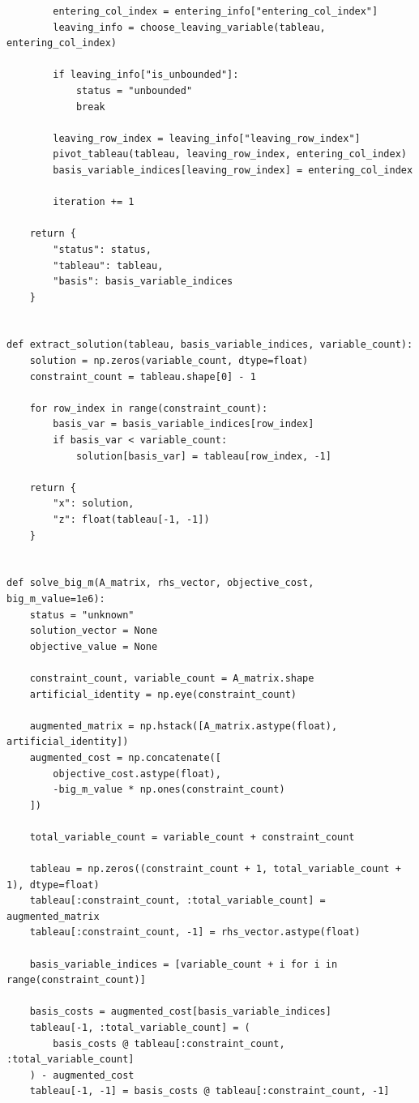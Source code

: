 \documentclass[a4paper,14pt]{extarticle}
\begin{document}
\begin{lstlisting}
        entering_col_index = entering_info["entering_col_index"]
        leaving_info = choose_leaving_variable(tableau, entering_col_index)

        if leaving_info["is_unbounded"]:
            status = "unbounded"
            break

        leaving_row_index = leaving_info["leaving_row_index"]
        pivot_tableau(tableau, leaving_row_index, entering_col_index)
        basis_variable_indices[leaving_row_index] = entering_col_index

        iteration += 1

    return {
        "status": status,
        "tableau": tableau,
        "basis": basis_variable_indices
    }


def extract_solution(tableau, basis_variable_indices, variable_count):
    solution = np.zeros(variable_count, dtype=float)
    constraint_count = tableau.shape[0] - 1

    for row_index in range(constraint_count):
        basis_var = basis_variable_indices[row_index]
        if basis_var < variable_count:
            solution[basis_var] = tableau[row_index, -1]

    return {
        "x": solution,
        "z": float(tableau[-1, -1])
    }


def solve_big_m(A_matrix, rhs_vector, objective_cost, big_m_value=1e6):
    status = "unknown"
    solution_vector = None
    objective_value = None

    constraint_count, variable_count = A_matrix.shape
    artificial_identity = np.eye(constraint_count)

    augmented_matrix = np.hstack([A_matrix.astype(float), artificial_identity])
    augmented_cost = np.concatenate([
        objective_cost.astype(float),
        -big_m_value * np.ones(constraint_count)
    ])

    total_variable_count = variable_count + constraint_count

    tableau = np.zeros((constraint_count + 1, total_variable_count + 1), dtype=float)
    tableau[:constraint_count, :total_variable_count] = augmented_matrix
    tableau[:constraint_count, -1] = rhs_vector.astype(float)

    basis_variable_indices = [variable_count + i for i in range(constraint_count)]

    basis_costs = augmented_cost[basis_variable_indices]
    tableau[-1, :total_variable_count] = (
        basis_costs @ tableau[:constraint_count, :total_variable_count]
    ) - augmented_cost
    tableau[-1, -1] = basis_costs @ tableau[:constraint_count, -1]


\end{lstlisting}
\end{document}
